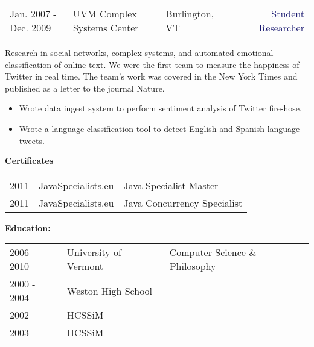 \documentclass{article}
\begin{document}
\pagebreak
\vspace{15pt}\begin{tabularx}{\textwidth}{@{}lllXr}
  Jan. 2007 - Dec. 2009&\textcolor{Mahogany}{UVM Complex Systems Center}&\textcolor{Black!80}{Burlington, VT}&&\textcolor{MidnightBlue}{Student Researcher}
\end{tabularx}

\vspace{3pt} Research in social networks, complex systems, and automated  emotional classification of online text.
We were the first team to measure the happiness of Twitter in real time. The team's work was covered in the New York Times and published as a letter to the journal Nature.
\vspace{3pt}\begin{multicols}{2}
  \begin{small}
    \begin{itemize}[leftmargin=*,label=\tiny{$\bullet$}]
    \item\begin{minipage}[t]{\linewidth}{Wrote data ingest system to perform sentiment analysis of Twitter fire-hose.}\end{minipage}
    \item\begin{minipage}[t]{\linewidth}{Wrote a language classification tool to detect English and Spanish language tweets.}\end{minipage}
    \end{itemize}
  \end{small} 
\end{multicols}

\vspace{10pt}\textbf{Certificates}

\vspace{3pt}\begin{tabular}{lll}
  2011 & JavaSpecialists.eu & Java Specialist Master\\
  2011 & JavaSpecialists.eu & Java Concurrency Specialist
\end{tabular}

\vspace{10pt}\textbf{Education:}

\vspace{3pt}\begin{tabular}{lll}
  2006 - 2010 & University of Vermont & Computer Science \& Philosophy\\
  2000 - 2004 & Weston High School &  \\
  2002 &  HCSSiM & \\
  2003 &  HCSSiM & \\ 
\end{tabular}
\end{document}
